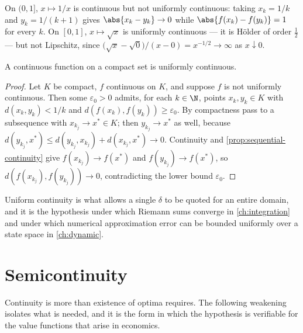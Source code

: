 \begin{eg}\label{eg:continuity-hierarchy}
	On $(0,1]$, $x\mapsto1/x$ is continuous but not uniformly continuous: taking
	$x_k=1/k$ and $y_k=1/(k+1)$ gives $\abs{x_k-y_k}\to0$ while
	$\abs{f(x_k)-f(y_k)}=1$ for every $k$. On $[0,1]$, $x\mapsto\sqrt x$ is
	uniformly continuous --- it is H\"older of order $\tfrac12$ --- but not
	Lipschitz, since $\bigl(\sqrt x-\sqrt0\bigr)/(x-0)=x^{-1/2}\to\infty$ as
	$x\downarrow0$.
\end{eg}

\begin{theorem}\label{thm:heine-cantor}
	A continuous function on a compact set is uniformly continuous.
\end{theorem}

\begin{proof}
	Let $K$ be compact, $f$ continuous on $K$, and suppose $f$ is not uniformly
	continuous. Then some $\varepsilon_0>0$ admits, for each $k\in\N$, points
	$x_k,y_k\in K$ with $d(x_k,y_k)<1/k$ and
	$d(f(x_k),f(y_k))\geq\varepsilon_0$. By compactness pass to a subsequence with
	$x_{k_j}\to x^\ast\in K$; then $y_{k_j}\to x^\ast$ as well, because
	$d(y_{k_j},x^\ast)\leq d(y_{k_j},x_{k_j})+d(x_{k_j},x^\ast)\to0$. Continuity and
	\autoref{prop:sequential-continuity} give
	$f(x_{k_j})\to f(x^\ast)$ and $f(y_{k_j})\to f(x^\ast)$, so
	$d(f(x_{k_j}),f(y_{k_j}))\to0$, contradicting the lower bound $\varepsilon_0$.
\end{proof}

Uniform continuity is what allows a single $\delta$ to be quoted for an entire
domain, and it is the hypothesis under which Riemann sums converge in
\autoref{ch:integration} and under which numerical approximation error can be
bounded uniformly over a state space in \autoref{ch:dynamic}.

\section{Semicontinuity}\label{sec:cont-semi}

Continuity is more than existence of optima requires. The following weakening
isolates what is needed, and it is the form in which the hypothesis is
verifiable for the value functions that arise in economics.

